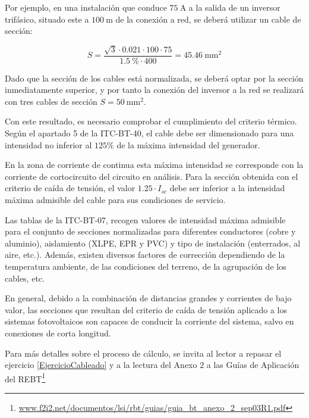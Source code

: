 Por ejemplo, en una instalación que conduce $\SI{75}{\ampere}$ a la
salida de un inversor trifásico, situado este a $\SI{100}{\meter}$ de
la conexión a red, se deberá utilizar un cable de sección:

\[
  S=\frac{\sqrt{3} \cdot 0.021 \cdot100\cdot75}{\SI{1.5}{\percent}\cdot400}=\SI{45.46}{\milli\meter\squared}
\]

Dado que la sección de los cables está normalizada, se deberá optar
por la sección inmediatamente superior, y por tanto la conexión del
inversor a la red se realizará con tres cables de sección
$S=\SI{50}{\milli\meter\squared}$.

Con este resultado, es necesario comprobar el cumplimiento del
criterio térmico. Según el apartado 5 de la ITC-BT-40, el cable debe
ser dimensionado para una intensidad no inferior al $125\%$ de la
máxima intensidad del generador.

En la zona de corriente de continua esta máxima intensidad se
corresponde con la corriente de cortocircuito del circuito en
análisis. Para la sección obtenida con el criterio de caída de
tensión, el valor $1.25 \cdot I_{sc}$ debe ser inferior a la
intensidad máxima admisible del cable para sus condiciones de
servicio.

Las tablas de la ITC-BT-07, recogen valores de intensidad máxima
admisible para el conjunto de secciones normalizadas para diferentes
conductores (cobre y aluminio), aislamiento (XLPE, EPR y PVC) y tipo
de instalación (enterrados, al aire, etc.). Además, existen diversos
factores de corrección dependiendo de la temperatura ambiente, de las
condiciones del terreno, de la agrupación de los cables, etc.

En general, debido a la combinación de distancias grandes y corrientes
de bajo valor, las secciones que resultan del criterio de caída de
tensión aplicado a los sistemas fotovoltaicos son capaces de conducir
la corriente del sistema, salvo en conexiones de corta longitud.

Para más detalles sobre el proceso de cálculo, se invita al lector a
repasar el ejercicio \ref{EjercicioCableado} y a la lectura del Anexo
2 a las Guías de Aplicación del
REBT\footnote{\url{www.f2i2.net/documentos/lsi/rbt/guias/guia_bt_anexo_2_sep03R1.pdf}}





